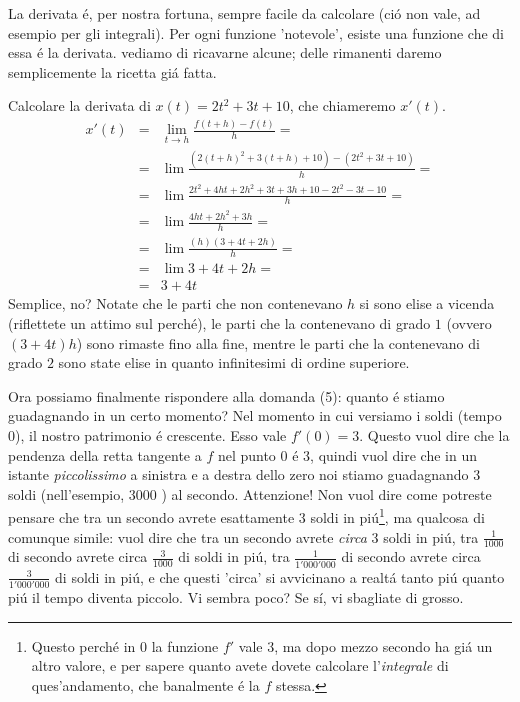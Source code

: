 La derivata \'e, per nostra fortuna, sempre facile da calcolare (ci\'o non vale, ad esempio per gli integrali). Per ogni funzione 'notevole',
esiste una funzione che di essa \'e la derivata. vediamo di ricavarne alcune; delle rimanenti daremo semplicemente la ricetta gi\'a fatta.

\begin{esercizio}
Calcolare la derivata di $x(t)=2t^2+3t+10$, che chiameremo $x'(t)$.
\begin{eqnarray}[rcl]
 x'(t) & = & \lim_{t \longrightarrow h} \frac{f(t+h)-f(t)}{h} = \\
       & = & \lim \frac{(2(t+h)^2+3(t+h)+10)-(2t^2+3t+10)}{h} = \\
       & = & \lim \frac{2t^2+4ht+2h^2+3t+3h+10-2t^2-3t-10}{h}= \\
       & = & \lim \frac{4ht+2h^2+3h}{h}= \\
       & = & \lim \frac{(h)(3+4t+2h)}{h}= \\
       & = & \lim 3+4t+2h= \\
       & = & 3+4t
\end{eqnarray}
Semplice, no? Notate che le parti che non contenevano $h$ si sono elise a vicenda (riflettete un attimo
sul perch\'e), le parti che la contenevano di grado $1$ (ovvero $(3+4t)h$) sono rimaste fino alla fine,
mentre le parti che la contenevano di grado $2$ sono state elise in quanto infinitesimi di ordine superiore.
\end{esercizio}

Ora possiamo finalmente rispondere alla domanda (5): quanto \'e stiamo guadagnando in un certo momento?
Nel momento in cui versiamo i soldi (tempo $0$), il nostro patrimonio \'e crescente. Esso vale $f'(0)=3$.
Questo vuol dire che la pendenza della retta tangente a $f$ nel punto $0$ \'e $3$, quindi vuol dire che in
un istante {\em piccolissimo} a sinistra e a destra dello zero noi stiamo guadagnando $3$ soldi (nell'esempio,
$3000$ \EUR) al secondo. Attenzione! Non vuol dire come potreste pensare che tra un secondo avrete esattamente
$3$ soldi in pi\'u\footnote{Questo perch\'e in $0$ la funzione $f'$ vale $3$, ma dopo mezzo secondo ha gi\'a
un altro valore, e per sapere quanto avete dovete calcolare l'{\em integrale} di ques'andamento, che banalmente
\'e la $f$ stessa.}, ma qualcosa di comunque simile: vuol dire che tra un secondo avrete {\em circa} $3$ soldi
in pi\'u, tra $\frac{1}{1000}$ di secondo avrete circa $\frac{3}{1000}$ di soldi in pi\'u, tra $\frac{1}{1'000'000}$
di secondo avrete circa $\frac{3}{1'000'000}$ di soldi in pi\'u, e che questi 'circa' si avvicinano a realt\'a
tanto pi\'u quanto pi\'u il tempo diventa piccolo. Vi sembra poco? Se s\'i, vi sbagliate di grosso.

